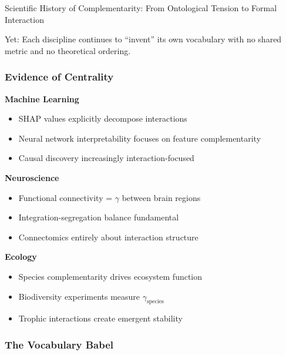 \begin{chapter}{Scientific History of Complementarity: From Ontological Tension to Formal Interaction}
\begin{tcolorbox}[colback=red!5!white,colframe=red!75!black,title=\textbf{The Contemporary Bottleneck}]
Yet: Each discipline continues to ``invent'' its own vocabulary with no shared metric and no theoretical ordering.
\end{tcolorbox}

\subsubsection{Evidence of Centrality}

\textbf{Machine Learning}
\begin{itemize}[noitemsep]
    \item SHAP values explicitly decompose interactions
    \item Neural network interpretability focuses on feature complementarity
    \item Causal discovery increasingly interaction-focused
\end{itemize}

\textbf{Neuroscience}
\begin{itemize}[noitemsep]
    \item Functional connectivity = $\gamma$ between brain regions
    \item Integration-segregation balance fundamental
    \item Connectomics entirely about interaction structure
\end{itemize}

\textbf{Ecology}
\begin{itemize}[noitemsep]
    \item Species complementarity drives ecosystem function
    \item Biodiversity experiments measure $\gamma_{\text{species}}$
    \item Trophic interactions create emergent stability
\end{itemize}

\subsubsection{The Vocabulary Babel}


\end{chapter}
